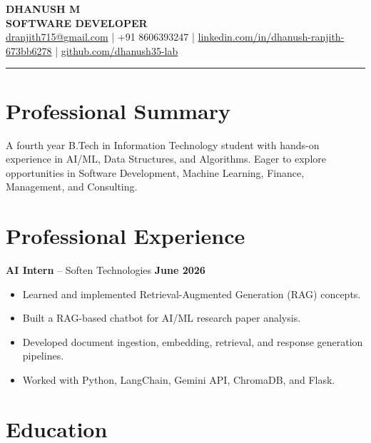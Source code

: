 \documentclass[a4paper,11pt]{article}
\begin{document}

\begin{center}
{\Huge \textbf{DHANUSH M}} \\[3pt]
{\large \textbf{SOFTWARE DEVELOPER}} \\[6pt]
\small
\href{mailto:dranjith715@gmail.com}{dranjith715@gmail.com} \quad|\quad
+91 8606393247 \quad|\quad
\href{https://linkedin.com/in/dhanush-ranjith-673bb6278}{linkedin.com/in/dhanush-ranjith-673bb6278} \quad|\quad
\href{https://github.com/dhanush35-lab}{github.com/dhanush35-lab}
\end{center}

\vspace{-4pt}
\hrule
\vspace{6pt}

\section*{Professional Summary}
A fourth year B.Tech in Information Technology student with hands-on experience in AI/ML, Data Structures, and Algorithms. Eager to explore opportunities in Software Development, Machine Learning, Finance, Management, and Consulting.

\section*{Professional Experience}

\noindent\textbf{AI Intern} -- Soften Technologies \hfill \textbf{June 2026}
\begin{itemize}
\item Learned and implemented Retrieval-Augmented Generation (RAG) concepts.
\item Built a RAG-based chatbot for AI/ML research paper analysis.
\item Developed document ingestion, embedding, retrieval, and response generation pipelines.
\item Worked with Python, LangChain, Gemini API, ChromaDB, and Flask.
\end{itemize}

\section*{Education}
\end{document}
